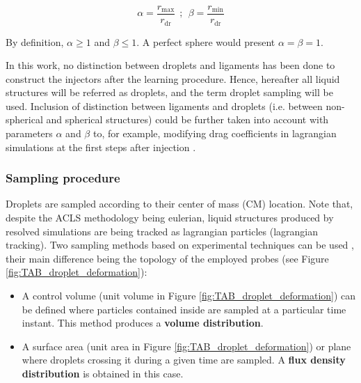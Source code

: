 \begin{equation}
\label{eq:ch4_deformation_parameters_alpha_beta_calculation}
\alpha = \frac{r_\mathrm{max}}{r_\mathrm{dr}} ~~ ; ~~ \beta = \frac{r_\mathrm{min}}{r_\mathrm{dr}}
\end{equation}	

By definition, $\alpha \geq 1$ and $\beta \leq 1$. A perfect sphere would present $\alpha = \beta = 1$.

In this work, no distinction between droplets and ligaments has been done to construct the injectors after the learning procedure. Hence, hereafter all liquid structures will be referred as droplets, and the term droplet sampling will be used. Inclusion of distinction between ligaments and droplets (i.e. between non-spherical and spherical structures) could be further taken into account with parameters $\alpha$ and $\beta$ to, for example, modifying drag coefficients in lagrangian simulations at the first steps after injection . 


\subsubsection*{Sampling procedure}

Droplets are sampled according to their center of mass (CM) location. Note that, despite the ACLS methodology being eulerian, liquid structures produced by resolved simulations are being tracked as lagrangian particles (lagrangian tracking). Two sampling methods based on experimental techniques can be used , their main difference being the topology of the employed probes (see Figure \ref{fig:TAB_droplet_deformation}):

\begin{itemize}

	\item A control volume (unit volume in Figure \ref{fig:TAB_droplet_deformation}) can be defined where particles contained inside are sampled at a particular time instant. This method produces a \textbf{volume distribution}. 
	
	\item A surface area (unit area in Figure \ref{fig:TAB_droplet_deformation}) or plane where droplets crossing it during a given time are sampled. A \textbf{flux density distribution} is obtained in this case.

\end{itemize}


